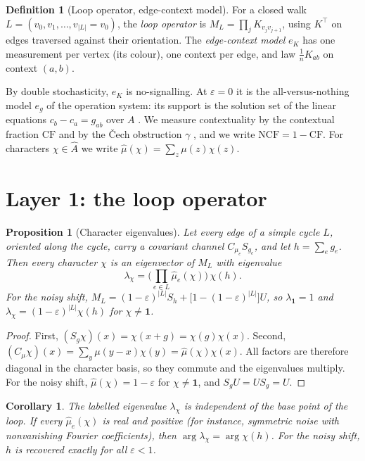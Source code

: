 \documentclass[11pt]{article}
\newtheorem{proposition}[theorem]{Proposition}
\newtheorem{corollary}[theorem]{Corollary}
\theoremstyle{definition}
\newtheorem{definition}[theorem]{Definition}
\theoremstyle{remark}
\newcommand{\CF}{\mathrm{CF}}
\newcommand{\NCF}{\mathrm{NCF}}
\begin{document}
\begin{definition}[Loop operator, edge-context model]
For a closed walk $L=(v_0,v_1,\dots,v_{|L|}=v_0)$, the \emph{loop operator} is $M_L=\prod_{j} K_{v_jv_{j+1}}$, using $K^{\top}$ on edges traversed against their orientation. The \emph{edge-context model} $e_K$ has one measurement per vertex (its colour), one context per edge, and law $\tfrac1n K_{ab}$ on context $(a,b)$.
\end{definition}

By double stochasticity, $e_K$ is no-signalling. At $\varepsilon=0$ it is the all-versus-nothing model $e_g$ of the operation system: its support is the solution set of the linear equations $c_b-c_a=g_{ab}$ over $A$ \cite{abkm15}. We measure contextuality by the contextual fraction $\CF$ \cite{abm17} and by the \v{C}ech obstruction $\gamma$ \cite{amb12}, and we write $\NCF=1-\CF$. For characters $\chi\in\widehat A$ we write $\hat\mu(\chi)=\sum_z\mu(z)\chi(z)$.

\section{Layer 1: the loop operator}

\begin{proposition}[Character eigenvalues]\label{prop:eig}
Let every edge of a simple cycle $L$, oriented along the cycle, carry a covariant channel $C_{\mu_e}S_{g_e}$, and let $h=\sum_e g_e$. Then every character $\chi$ is an eigenvector of $M_L$ with eigenvalue
\[
\lambda_\chi=\Big(\prod_{e\in L}\hat\mu_e(\chi)\Big)\,\chi(h).
\]
For the noisy shift, $M_L=(1-\varepsilon)^{|L|}S_h+\big[1-(1-\varepsilon)^{|L|}\big]U$, so $\lambda_{\mathbf 1}=1$ and $\lambda_\chi=(1-\varepsilon)^{|L|}\chi(h)$ for $\chi\neq\mathbf 1$.
\end{proposition}
\begin{proof}
First, $(S_g\chi)(x)=\chi(x+g)=\chi(g)\chi(x)$. Second, $(C_\mu\chi)(x)=\sum_y\mu(y-x)\chi(y)=\hat\mu(\chi)\chi(x)$. All factors are therefore diagonal in the character basis, so they commute and the eigenvalues multiply. For the noisy shift, $\hat\mu(\chi)=1-\varepsilon$ for $\chi\ne\mathbf 1$, and $S_gU=US_g=U$.
\end{proof}

\begin{corollary}\label{cor:phase}
The labelled eigenvalue $\lambda_\chi$ is independent of the base point of the loop. If every $\hat\mu_e(\chi)$ is real and positive (for instance, symmetric noise with nonvanishing Fourier coefficients), then $\arg\lambda_\chi=\arg\chi(h)$. For the noisy shift, $h$ is recovered exactly for all $\varepsilon<1$.
\end{corollary}
\end{document}
